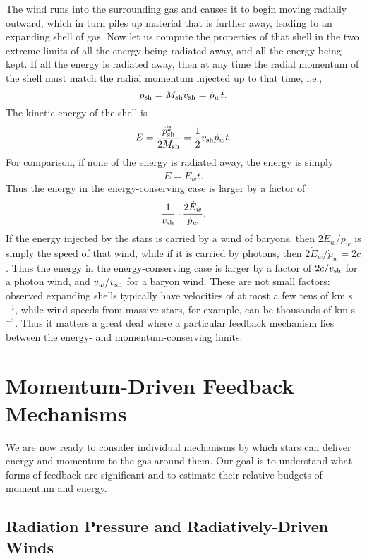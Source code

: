 The wind runs into the surrounding gas and causes it to begin moving radially outward, which in turn piles up material that is further away, leading to an expanding shell of gas. Now let us compute the properties of that shell in the two extreme limits of all the energy being radiated away, and all the energy being kept. If all the energy is radiated away, then at any time the radial momentum of the shell must match the radial momentum injected up to that time, i.e.,
\begin{equation}
p_{\rm sh} = M_{\rm sh} v_{\rm sh} = \dot{p}_w t.
\end{equation}
The kinetic energy of the shell is
\begin{equation}
E = \frac{\dot{p}_{\rm sh}^2}{2 M_{\rm sh}} = \frac{1}{2} v_{\rm sh} \dot{p}_w t.
\end{equation} 
For comparison, if none of the energy is radiated away, the energy is simply
\begin{equation}
E = \dot{E}_w t.
\end{equation}
Thus the energy in the energy-conserving case is larger by a factor of
\begin{equation}
\frac{1}{v_{\rm sh}} \cdot \frac{2\dot{E}_w}{\dot{p}_w}.
\end{equation}
If the energy injected by the stars is carried by a wind of baryons, then $2\dot{E}_w/\dot{p}_w$ is simply the speed of that wind, while if it is carried by photons, then $2\dot{E}_w/\dot{p}_w = 2 c$. Thus the energy in the energy-conserving case is larger by a factor of $2c/v_{\rm sh}$ for a photon wind, and $v_w/v_{\rm sh}$ for a baryon wind. These are not small factors: observed expanding shells typically have velocities of at most a few tens of km s$^{-1}$, while wind speeds from massive stars, for example, can be thousands of km s$^{-1}$. Thus it matters a great deal where a particular feedback mechanism lies between the energy- and momentum-conserving limits.

\section{Momentum-Driven Feedback Mechanisms}

We are now ready to consider individual mechanisms by which stars can deliver energy and momentum to the gas around them. Our goal is to understand what forms of feedback are significant and to estimate their relative budgets of momentum and energy.

\subsection{Radiation Pressure and Radiatively-Driven Winds}

